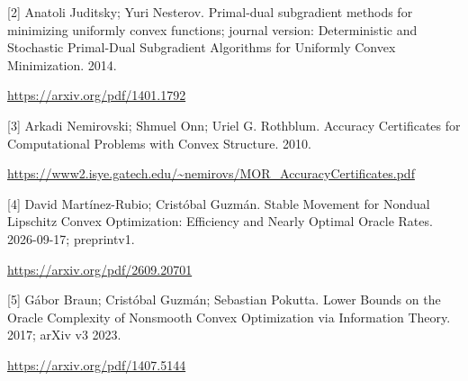 \documentclass[10pt,a4paper]{article}
\begin{document}
[2] Anatoli Juditsky; Yuri Nesterov. Primal-dual subgradient methods for minimizing uniformly convex functions; journal version: Deterministic and Stochastic Primal-Dual Subgradient Algorithms for Uniformly Convex Minimization. 2014.

\url{https://arxiv.org/pdf/1401.1792}

[3] Arkadi Nemirovski; Shmuel Onn; Uriel G. Rothblum. Accuracy Certificates for Computational Problems with Convex Structure. 2010.

\url{https://www2.isye.gatech.edu/~nemirovs/MOR_AccuracyCertificates.pdf}

[4] David Martínez-Rubio; Cristóbal Guzmán. Stable Movement for Nondual Lipschitz Convex Optimization: Efficiency and Nearly Optimal Oracle Rates. 2026-09-17; preprintv1.

\url{https://arxiv.org/pdf/2609.20701}

[5] Gábor Braun; Cristóbal Guzmán; Sebastian Pokutta. Lower Bounds on the Oracle Complexity of Nonsmooth Convex Optimization via Information Theory. 2017; arXiv v3 2023.

\url{https://arxiv.org/pdf/1407.5144}
\end{document}
